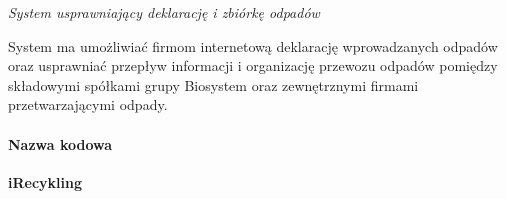

\emph{System usprawniający deklarację i zbiórkę odpadów} 

System ma umożliwiać firmom internetową deklarację wprowadzanych odpadów oraz usprawniać przepływ informacji i organizację przewozu odpadów pomiędzy składowymi spółkami grupy Biosystem oraz zewnętrznymi firmami przetwarzającymi odpady.

\paragraph{Nazwa kodowa} \textbf{iRecykling}
